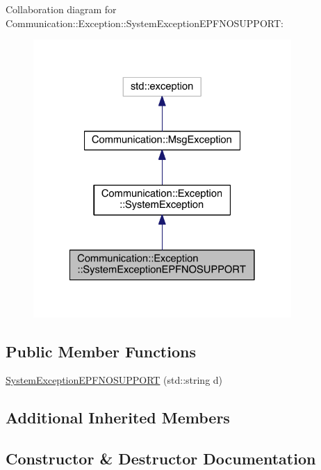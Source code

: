 Collaboration diagram for Communication\+:\+:Exception\+:\+:System\+Exception\+E\+P\+F\+N\+O\+S\+U\+P\+P\+O\+R\+T\+:\nopagebreak
\begin{figure}[H]
\begin{center}
\leavevmode
\includegraphics[width=278pt]{class_communication_1_1_exception_1_1_system_exception_e_p_f_n_o_s_u_p_p_o_r_t__coll__graph}
\end{center}
\end{figure}
\subsection*{Public Member Functions}
\begin{DoxyCompactItemize}
\item 
\hyperlink{class_communication_1_1_exception_1_1_system_exception_e_p_f_n_o_s_u_p_p_o_r_t_a401865b68efbdd7988ab15013c87aaae}{System\+Exception\+E\+P\+F\+N\+O\+S\+U\+P\+P\+O\+R\+T} (std\+::string d)
\end{DoxyCompactItemize}
\subsection*{Additional Inherited Members}


\subsection{Constructor \& Destructor Documentation}
\hypertarget{class_communication_1_1_exception_1_1_system_exception_e_p_f_n_o_s_u_p_p_o_r_t_a401865b68efbdd7988ab15013c87aaae}{}
